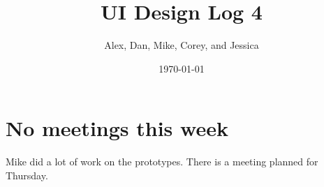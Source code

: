 \documentclass{article}
\title{UI Design Log 4}
\author{Alex, Dan, Mike, Corey, and Jessica}
\date{\today}
\begin{document}
\maketitle
\section{No meetings this week}
Mike did a lot of work on the prototypes. There is a meeting planned for
Thursday.
\end{document}
